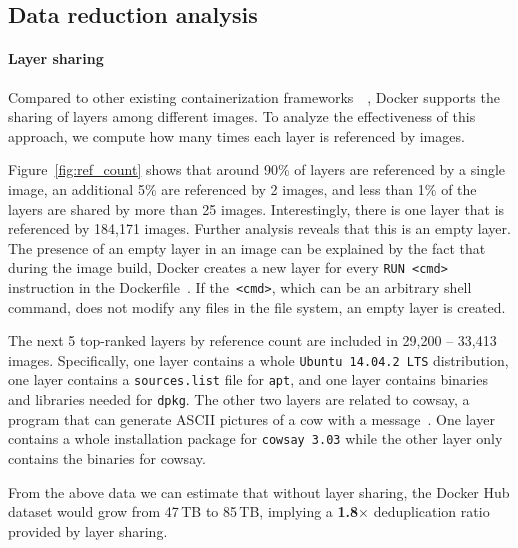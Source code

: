 \subsection{Data reduction analysis} 
\label{sec:dedup_ratio}

\paragraph{Layer sharing}

%
%
Compared to other existing containerization frameworks~\cite{openvz}~\cite{singularity},
Docker supports the sharing of layers among different images.
%
To analyze the effectiveness of this approach, we compute how many times
each layer is referenced by images.

Figure~\ref{fig:ref_count} shows that around 90\% of layers are referenced by
a single image, an additional 5\% are referenced by 2 images, and less than
1\% of the layers are shared by more than 25 images.
%
Interestingly, there is one layer that is referenced by 184,171 images.
Further analysis reveals that this is an empty layer.
%
The presence of an empty layer in an image can be explained
by the fact that during the image build, Docker creates a new layer
for every \texttt{RUN <cmd>} instruction
in the Dockerfile~\cite{Dockerfile}.
%
If the~\texttt{<cmd>}, which can be an arbitrary shell command,
does not modify any files in the file system,
an empty layer is created.
%

The next 5 top-ranked layers by reference count
are included in 29,200 -- 33,413 images.
Specifically, one layer contains a whole \texttt{Ubuntu 14.04.2 LTS} distribution,
one layer contains a \texttt{sources.list} file for \texttt{apt},
and one layer contains binaries and libraries needed for \texttt{dpkg}.
The other two layers are related to cowsay, a program that can generate ASCII pictures of a cow with a message~\cite{cowsay}.
One layer contains a whole installation package for \texttt{cowsay 3.03} 
while the other layer only contains the binaries for cowsay.

From the above data we can estimate that without layer sharing, the Docker Hub
dataset would grow from 47\,TB to 85\,TB, implying a \textbf{1.8$\times$} deduplication
ratio provided by layer sharing.
 
